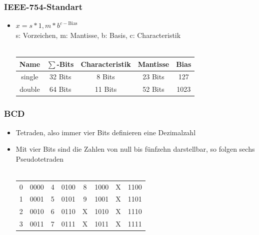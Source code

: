 \documentclass{kit}
\begin{document}
    \subsubsection{IEEE-754-Standart}
      \begin{itemize}
        \item $x=s*1,m*b^{c-\text{Bias}}$\\
          s: Vorzeichen, m: Mantisse, b: Basis, c: Characteristik\\\\
          \begin{tabular}{|c|c|c|c|c|}
            \hline
            Name & $\sum$-Bits & Characteristik & Mantisse & Bias \\
            \hline 
            \hline
            single & 32 Bits & 8 Bits & 23 Bits & 127 \\
            \hline
            double & 64 Bits & 11 Bits & 52 Bits & 1023\\
            \hline
          \end{tabular}
      \end{itemize}
    \subsubsection{BCD}
      \begin{itemize}
        \item Tetraden, also immer vier Bits definieren eine Dezimalzahl
        \item Mit vier Bits sind die Zahlen von null bis fünfzehn darstellbar, so folgen sechs 
          Pseudotetraden\\\\
          \begin{tabular}{|c|c||c|c||c|c||c|c|}
            \hline
            0 & 0000 & 4 & 0100 & 8 & 1000 & X & 1100\\
            1 & 0001 & 5 & 0101 & 9 & 1001 & X & 1101\\
            2 & 0010 & 6 & 0110 & X & 1010 & X & 1110\\
            3 & 0011 & 7 & 0111 & X & 1011 & X & 1111\\
            \hline
          \end{tabular}
      \end{itemize}
\end{document}
